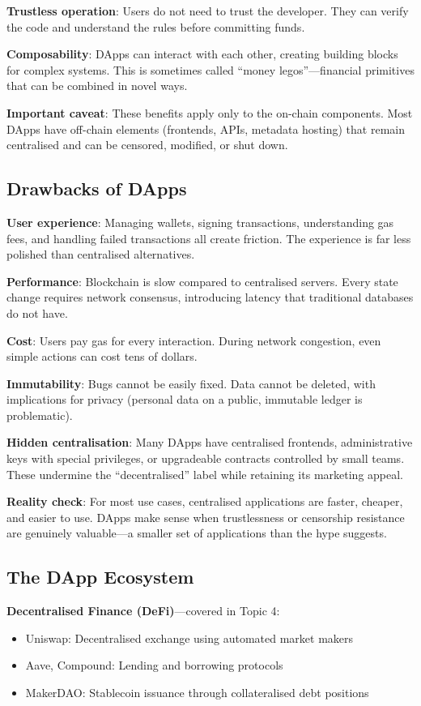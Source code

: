 \documentclass[11pt,a4paper]{article}
\begin{document}
\textbf{Trustless operation}: Users do not need to trust the developer. They can verify the code and understand the rules before committing funds.

\textbf{Composability}: DApps can interact with each other, creating building blocks for complex systems. This is sometimes called ``money legos''---financial primitives that can be combined in novel ways.

\textbf{Important caveat}: These benefits apply only to the on-chain components. Most DApps have off-chain elements (frontends, APIs, metadata hosting) that remain centralised and can be censored, modified, or shut down.

\subsection{Drawbacks of DApps}

\textbf{User experience}: Managing wallets, signing transactions, understanding gas fees, and handling failed transactions all create friction. The experience is far less polished than centralised alternatives.

\textbf{Performance}: Blockchain is slow compared to centralised servers. Every state change requires network consensus, introducing latency that traditional databases do not have.

\textbf{Cost}: Users pay gas for every interaction. During network congestion, even simple actions can cost tens of dollars.

\textbf{Immutability}: Bugs cannot be easily fixed. Data cannot be deleted, with implications for privacy (personal data on a public, immutable ledger is problematic).

\textbf{Hidden centralisation}: Many DApps have centralised frontends, administrative keys with special privileges, or upgradeable contracts controlled by small teams. These undermine the ``decentralised'' label while retaining its marketing appeal.

\textbf{Reality check}: For most use cases, centralised applications are faster, cheaper, and easier to use. DApps make sense when trustlessness or censorship resistance are genuinely valuable---a smaller set of applications than the hype suggests.

\subsection{The DApp Ecosystem}

\textbf{Decentralised Finance (DeFi)}---covered in Topic 4:
\begin{itemize}
    \item Uniswap: Decentralised exchange using automated market makers
    \item Aave, Compound: Lending and borrowing protocols
    \item MakerDAO: Stablecoin issuance through collateralised debt positions
\end{itemize}
\end{document}
